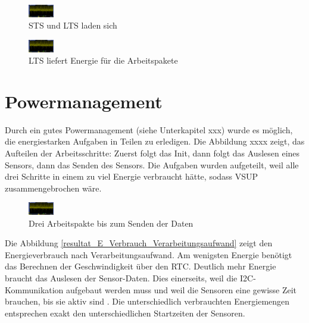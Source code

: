 \begin{figure}[ht]
\includegraphics[width=0.1\textwidth]{4Resultate/imag/SpannungVCC.png} 
\caption{STS und LTS laden sich}
\end{figure}

\begin{figure}[ht]
\includegraphics[width=0.1\textwidth]{4Resultate/imag/SpannungVCC.png} 
\caption{LTS liefert Energie für die Arbeitspakete}
\end{figure}


\section{Powermanagement}

Durch ein gutes Powermanagement (siehe Unterkapitel xxx) wurde es möglich, die energiestarken Aufgaben in Teilen zu erledigen. Die Abbildung xxxx zeigt, das Aufteilen der Arbeitsschritte: Zuerst folgt das Init, dann folgt das Auslesen eines Sensors, dann das Senden des Sensors. Die Aufgaben wurden aufgeteilt, weil alle drei Schritte in einem zu viel Energie verbraucht hätte, sodass VSUP zusammengebrochen wäre.

\begin{figure}[ht]
\includegraphics[width=0.1\textwidth]{4Resultate/imag/SpannungVCC.png} 
\caption{Drei Arbeitspakte bis zum Senden der Daten }
\end{figure}


Die Abbildung \ref{resultat_E_Verbrauch_Verarbeitungsaufwand} zeigt den Energieverbrauch nach Verarbeitungsaufwand. Am wenigsten Energie benötigt das Berechnen der Geschwindigkeit über den RTC. Deutlich mehr Energie braucht das Auslesen der Sensor-Daten. Dies einerseits, weil die I2C-Kommunikation aufgebaut werden muss und weil die Sensoren eine gewisse Zeit brauchen, bis sie aktiv sind . Die unterschiedlich verbrauchten Energiemengen entsprechen exakt den unterschiedlichen Startzeiten der Sensoren. 


